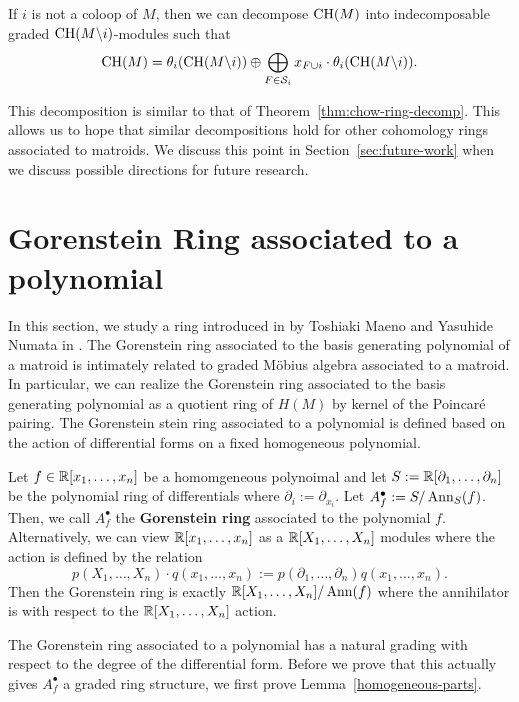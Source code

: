 \documentclass{puthesis-UG}
\begin{document}
\begin{thm} \label{thm:augmented-chow-ring-krull-schmidt-decomp}
	If $i$ is not a coloop of $M$, then we can decompose $\operatorname{CH}(M)$ into indecomposable graded $\operatorname{CH}(M \backslash i)$-modules such that 
	\[
		\operatorname{CH}(M) = \theta_i (\operatorname{CH}(M \backslash i)) \oplus \bigoplus_{F \in \mathcal{S}_i} x_{F \cup i} \cdot \theta_i (\operatorname{CH}(M \backslash i)).
	\]
\end{thm}

This decomposition is similar to that of Theorem~\ref{thm:chow-ring-decomp}. This allows us to hope that similar decompositions hold for other cohomology rings associated to matroids. We discuss this point in Section~\ref{sec:future-work} when we discuss possible directions for future research. 

\section{Gorenstein Ring associated to a polynomial}

In this section, we study a ring introduced in by Toshiaki Maeno and Yasuhide Numata in \cite{MN-gorenstein}. The Gorenstein ring associated to the basis generating polynomial of a matroid is intimately related to graded M\"obius algebra associated to a matroid. In particular, we can realize the Gorenstein ring associated to the basis generating polynomial as a quotient ring of $H(M)$ by kernel of the Poincar\'e pairing. The Gorenstein stein ring associated to a polynomial is defined based on the action of differential forms on a fixed homogeneous polynomial.

\begin{defn}
	Let $f \in \mathbb{R}[x_1, \ldots, x_n]$ be a homomgeneous polynoimal and let $S := \mathbb{R}[\partial_1, \ldots, \partial_n]$ be the polynomial ring of differentials where $\partial_i := \partial_{x_i}$. Let $A_f^\bullet := S / \operatorname{Ann}_S (f)$. Then, we call $A_f^\bullet$ the \textbf{Gorenstein ring} associated to the polynomial $f$. Alternatively, we can view $\mathbb{R}[x_1, \ldots, x_n]$ as a $\mathbb{R}[X_1, \ldots, X_n]$ modules where the action is defined by the relation
	\[
		p(X_1, \ldots, X_n) \cdot q(x_1, \ldots, x_n) := p(\partial_1, \ldots, \partial_n) q(x_1, \ldots, x_n). 
	\]
	Then the Gorenstein ring is exactly $\mathbb{R}[X_1, \ldots, X_n] / \operatorname{Ann} (f)$ where the annihilator is with respect to the $\mathbb{R}[X_1, \ldots, X_n]$ action. 
\end{defn}

The Gorenstein ring associated to a polynomial has a natural grading with respect to the degree of the differential form. Before we prove that this actually gives $A_f^\bullet$ a graded ring structure, we first prove Lemma~\ref{homogeneous-parts}.
\end{document}
